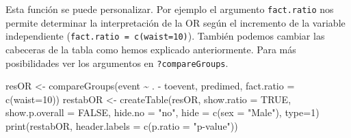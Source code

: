 \documentclass[
]{book}
\newenvironment{Shaded}{\begin{snugshade}}{\end{snugshade}}
\newcommand{\AttributeTok}[1]{\textcolor[rgb]{0.77,0.63,0.00}{#1}}
\newcommand{\ConstantTok}[1]{\textcolor[rgb]{0.00,0.00,0.00}{#1}}
\newcommand{\DecValTok}[1]{\textcolor[rgb]{0.00,0.00,0.81}{#1}}
\newcommand{\FunctionTok}[1]{\textcolor[rgb]{0.00,0.00,0.00}{#1}}
\newcommand{\NormalTok}[1]{#1}
\newcommand{\OtherTok}[1]{\textcolor[rgb]{0.56,0.35,0.01}{#1}}
\newcommand{\SpecialCharTok}[1]{\textcolor[rgb]{0.00,0.00,0.00}{#1}}
\newcommand{\StringTok}[1]{\textcolor[rgb]{0.31,0.60,0.02}{#1}}
\begin{document}
Esta función se puede personalizar. Por ejemplo el argumento \texttt{fact.ratio} nos permite determinar la interpretación de la OR según el incremento de la variable independiente (\texttt{fact.ratio\ =\ c(waist=10)}). También podemos cambiar las cabeceras de la tabla como hemos explicado anteriormente. Para más posibilidades ver los argumentos en \texttt{?compareGroups}.

\begin{Shaded}
\begin{Highlighting}[]
\NormalTok{resOR }\OtherTok{\textless{}{-}} \FunctionTok{compareGroups}\NormalTok{(event }\SpecialCharTok{\textasciitilde{}}\NormalTok{ . }\SpecialCharTok{{-}}\NormalTok{ toevent, predimed, }
                       \AttributeTok{fact.ratio =} \FunctionTok{c}\NormalTok{(}\AttributeTok{waist=}\DecValTok{10}\NormalTok{))}
\NormalTok{restabOR }\OtherTok{\textless{}{-}} \FunctionTok{createTable}\NormalTok{(resOR, }\AttributeTok{show.ratio =} \ConstantTok{TRUE}\NormalTok{,}
                        \AttributeTok{show.p.overall =} \ConstantTok{FALSE}\NormalTok{, }
                        \AttributeTok{hide.no =} \StringTok{"no"}\NormalTok{, }
                        \AttributeTok{hide =} \FunctionTok{c}\NormalTok{(}\AttributeTok{sex =} \StringTok{"Male"}\NormalTok{), }\AttributeTok{type=}\DecValTok{1}\NormalTok{)}
\FunctionTok{print}\NormalTok{(restabOR, }\AttributeTok{header.labels =} \FunctionTok{c}\NormalTok{(}\AttributeTok{p.ratio =} \StringTok{"p{-}value"}\NormalTok{))}
\end{Highlighting}
\end{Shaded}
\end{document}
